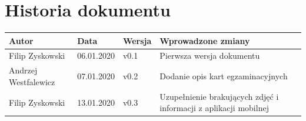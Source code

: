 \documentclass{article}
\begin{document}
\section{Historia dokumentu}

\begin{tabularx}{\linewidth}{|X|l|l|X|}
    \hline
    Autor & Data & Wersja & Wprowadzone zmiany \\
    \hline
    Filip Zyskowski & 06.01.2020 & v0.1 & Pierwsza wersja dokumentu \\
    \hline
    Andrzej Westfalewicz & 07.01.2020 & v0.2 & Dodanie opis kart egzaminacyjnych \\
    \hline
    Filip Zyskowski & 13.01.2020 & v0.3 & Uzupełnienie brakujących zdjęć i informacji z aplikacji mobilnej \\
    \hline
\end{tabularx}
\end{document}
